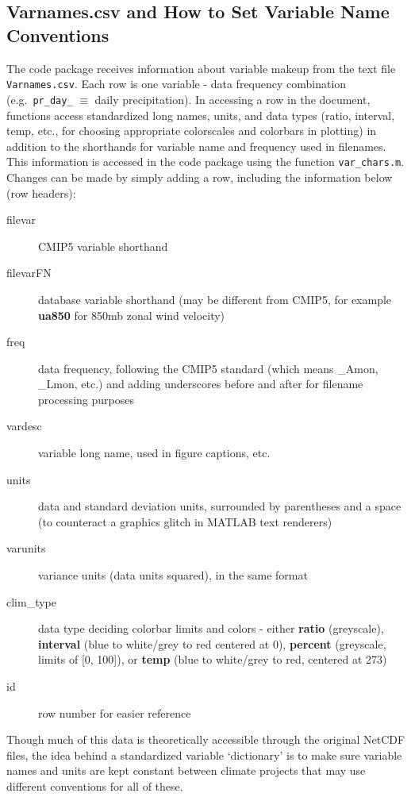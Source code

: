 \documentclass{article}
\begin{document}
\subsection{Varnames.csv and How to Set Variable Name Conventions}
The code package receives information about variable makeup from the text file \texttt{Varnames.csv}. Each row is one variable - data frequency combination (e.g.\ \texttt{pr\_day\_} $\equiv$ daily precipitation). In accessing a row in the document, functions access standardized long names, units, and data types (ratio, interval, temp, etc., for choosing appropriate colorscales and colorbars in plotting) in addition to the shorthands for variable name and frequency used in filenames. This information is accessed in the code package using the function \texttt{var\_chars.m}. Changes can be made by simply adding a row, including the information below (row headers):
\begin{description}
\item [filevar] CMIP5 variable shorthand
\item [filevarFN] database variable shorthand (may be different from CMIP5, for example \textbf{ua850} for 850mb zonal wind velocity)
\item [freq] data frequency, following the CMIP5 standard (which means \_Amon, \_Lmon, etc.) and adding underscores before and after for filename processing purposes
\item [vardesc] variable long name, used in figure captions, etc.
\item [units] data and standard deviation units, surrounded by parentheses and a space (to counteract a graphics glitch in MATLAB text renderers)
\item [varunits] variance units (data units squared), in the same format
\item [clim\_type] data type deciding colorbar limits and colors - either \textbf{ratio} (greyscale), \textbf{interval} (blue to white/grey to red centered at 0), \textbf{percent} (greyscale, limits of [0, 100]), or \textbf{temp} (blue to white/grey to red, centered at 273)
\item [id] row number for easier reference
\end{description}

Though much of this data is theoretically accessible through the original NetCDF files, the idea behind a standardized variable `dictionary' is to make sure variable names and units are kept constant between climate projects that may use different conventions for all of these.
\end{document}
